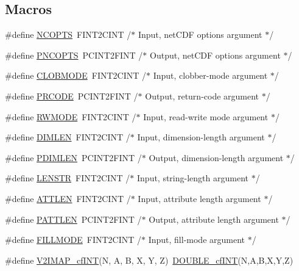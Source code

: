 \subsection*{Macros}
\begin{DoxyCompactItemize}
\item 
\#define \hyperlink{fort-v2compat_8c_ad34fd007826863dc1084c1c893ce5934}{N\+C\+O\+P\+TS}~F\+I\+N\+T2\+C\+I\+NT	/$\ast$ Input, net\+C\+DF options argument $\ast$/
\item 
\#define \hyperlink{fort-v2compat_8c_ad28923cfdb7eaecc17fef3711c74befc}{P\+N\+C\+O\+P\+TS}~P\+C\+I\+N\+T2\+F\+I\+NT	/$\ast$ Output, net\+C\+DF options argument $\ast$/
\item 
\#define \hyperlink{fort-v2compat_8c_abd5253773c995afc2eed8dee4a76a552}{C\+L\+O\+B\+M\+O\+DE}~F\+I\+N\+T2\+C\+I\+NT	/$\ast$ Input, clobber-\/mode argument $\ast$/
\item 
\#define \hyperlink{fort-v2compat_8c_ae2352f39cbd25bcaf1bedbbb12db73fe}{P\+R\+C\+O\+DE}~P\+C\+I\+N\+T2\+F\+I\+NT	/$\ast$ Output, return-\/code argument $\ast$/
\item 
\#define \hyperlink{fort-v2compat_8c_a36ab2e26d67d11b7bfcb8843dc4bfb43}{R\+W\+M\+O\+DE}~F\+I\+N\+T2\+C\+I\+NT	/$\ast$ Input, read-\/write mode argument $\ast$/
\item 
\#define \hyperlink{fort-v2compat_8c_a794de1e244ded083e471dd00db1329b1}{D\+I\+M\+L\+EN}~F\+I\+N\+T2\+C\+I\+NT	/$\ast$ Input, dimension-\/length argument $\ast$/
\item 
\#define \hyperlink{fort-v2compat_8c_a966419668dc6e6f3e34bc743e56397a6}{P\+D\+I\+M\+L\+EN}~P\+C\+I\+N\+T2\+F\+I\+NT	/$\ast$ Output, dimension-\/length argument $\ast$/
\item 
\#define \hyperlink{fort-v2compat_8c_afcbdb4ceefc87947c1f6254df71bdb36}{L\+E\+N\+S\+TR}~F\+I\+N\+T2\+C\+I\+NT	/$\ast$ Input, string-\/length argument $\ast$/
\item 
\#define \hyperlink{fort-v2compat_8c_a5274f0ce0562c9ab9da4004e7d85d738}{A\+T\+T\+L\+EN}~F\+I\+N\+T2\+C\+I\+NT	/$\ast$ Input, attribute length argument $\ast$/
\item 
\#define \hyperlink{fort-v2compat_8c_abba4da455082c98d8b81b6d70ff498de}{P\+A\+T\+T\+L\+EN}~P\+C\+I\+N\+T2\+F\+I\+NT	/$\ast$ Output, attribute length argument $\ast$/
\item 
\#define \hyperlink{fort-v2compat_8c_ac16ba8d3e41c763cb6b4cb86343afd7c}{F\+I\+L\+L\+M\+O\+DE}~F\+I\+N\+T2\+C\+I\+NT	/$\ast$ Input, fill-\/mode argument $\ast$/
\item 
\#define \hyperlink{fort-v2compat_8c_a096ac034b77abc298f6bbd4972cd764f}{V2\+I\+M\+A\+P\+\_\+cf\+I\+NT}(N,  A,  B,  X,  Y,  Z)~\hyperlink{cfortran_8h_af4cefaca6d372320e8ae4276f72f3210}{D\+O\+U\+B\+L\+E\+\_\+cf\+I\+NT}(N,A,B,X,Y,Z)

\end{DoxyCompactItemize}
